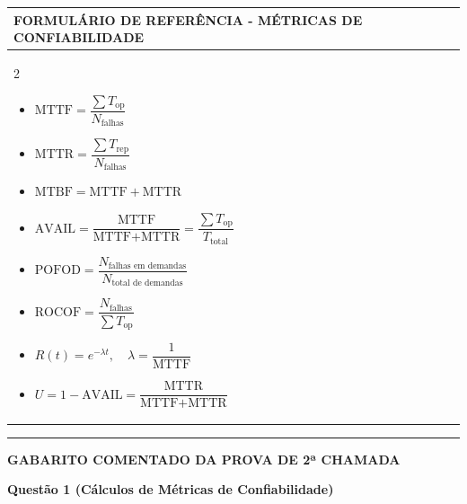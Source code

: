 \documentclass[12pt,a4paper]{article}
\begin{document}
\begin{center}
\begin{tabularx}{\textwidth}{|X|}
\hline
\cellcolor{gray!20}\centering \textbf{FORMULÁRIO DE REFERÊNCIA - MÉTRICAS DE CONFIABILIDADE} \tabularnewline
\hline
\vspace{0.1cm}
\begin{multicols}{2}
\small
\begin{itemize}[leftmargin=*,itemsep=3pt]
    \item $\text{MTTF} = \dfrac{\sum T_{\text{op}}}{N_{\text{falhas}}}$
    \item $\text{MTTR} = \dfrac{\sum T_{\text{rep}}}{N_{\text{falhas}}}$
    \item $\text{MTBF} = \text{MTTF} + \text{MTTR}$
    \item $\text{AVAIL} = \dfrac{\text{MTTF}}{\text{MTTF} + \text{MTTR}} = \dfrac{\sum T_{\text{op}}}{T_{\text{total}}}$
    \item $\text{POFOD} = \dfrac{N_{\text{falhas em demandas}}}{N_{\text{total de demandas}}}$
    \item $\text{ROCOF} = \dfrac{N_{\text{falhas}}}{\sum T_{\text{op}}}$
    \item $R(t) = e^{-\lambda t}, \quad \lambda = \dfrac{1}{\text{MTTF}}$
    \item $U = 1 - \text{AVAIL} = \dfrac{\text{MTTR}}{\text{MTTF} + \text{MTTR}}$
\end{itemize}
\end{multicols}
\vspace{-0.2cm}
\tabularnewline
\hline
\end{tabularx}
\end{center}

\vspace{0.3cm}

\begin{center}
    \rule{\textwidth}{0.4pt}
    \textbf{GABARITO COMENTADO DA PROVA DE 2ª CHAMADA}
\end{center}

\vspace{0.5cm}

\textbf{Questão 1 (Cálculos de Métricas de Confiabilidade)}
\end{document}
